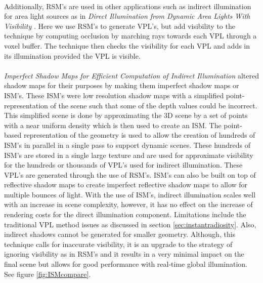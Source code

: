 \paragraph{}
Additionally, RSM's are used in other applications such as indirect illumination for area light sources as in \textit{Direct Illumination from Dynamic Area Lights With Visibility} \cite{Nichols2010}.  Here we use RSM's to generate VPL's, but add visibility to the technique by computing occlusion by marching rays towards each VPL through a voxel buffer.  The technique then checks the visibility for each VPL and adds in its illumination provided the VPL is visible.

\paragraph{}
\textit{Imperfect Shadow Maps for Efficient Computation of Indirect Illumination} \cite{Ritschel2008} altered shadow maps for their purposes by making them imperfect shadow maps or ISM's.  These ISM's were low resolution shadow maps with a simplified point-representation of the scene such that some of the depth values could be incorrect.  This simplified scene is done by approximating the 3D scene by a set of points with a near uniform density which is then used to create an ISM.  The point-based representation of the geometry is used to allow the creation of hundreds of ISM's in parallel in a single pass to support dynamic scenes.  These hundreds of ISM's are stored in a single large texture and are used for approximate visibility for the hundreds or thousands of VPL's used for indirect illumination.  These VPL's are generated through the use of RSM's.  ISM's can also be built on top of reflective shadow maps to create imperfect reflective shadow maps to allow for multiple bounces of light.  With the use of ISM's, indirect illumination scales well with an increase in scene complexity, however, it has no effect on the increase of rendering costs for the direct illumination component.  Limitations include the traditional VPL method issues as discussed in section \ref{sec:instantradiosity}.  Also, indirect shadows cannot be generated for smaller geometry.  Although, this technique calls for inaccurate visibility, it is an upgrade to the strategy of ignoring visibility as in RSM's and it results in a very minimal impact on the final scene but allows for good performance with real-time global illumination.  See figure \ref{fig:ISMcompare}.

